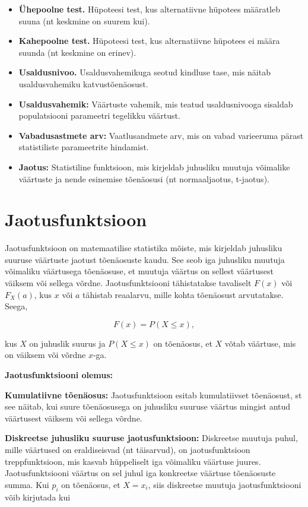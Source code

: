\documentclass[
]{book}
\providecommand{\tightlist}{%
  \setlength{\itemsep}{0pt}\setlength{\parskip}{0pt}}
\theoremstyle{definition}
\theoremstyle{definition}
\theoremstyle{definition}
\theoremstyle{definition}
\theoremstyle{remark}
\begin{document}
\begin{itemize}
\tightlist
\item
  \textbf{Ühepoolne test.} Hüpoteesi test, kus alternatiivne hüpotees määratleb suuna (nt keskmine on suurem kui).
\item
  \textbf{Kahepoolne test.} Hüpoteesi test, kus alternatiivne hüpotees ei määra suunda (nt keskmine on erinev).
\item
  \textbf{Usaldusnivoo.} Usaldusvahemikuga seotud kindluse tase, mis näitab usaldusvahemiku katvustõenäosust.
\item
  \textbf{Usaldusvahemik:} Väärtuste vahemik, mis teatud usaldusnivooga sisaldab populatsiooni parameetri tegelikku väärtust.
\item
  \textbf{Vabadusastmete arv:} Vaatlusandmete arv, mis on vabad varieeruma pärast statistiliste parameetrite hindamist.
\item
  \textbf{Jaotus:} Statistiline funktsioon, mis kirjeldab juhusliku muutuja võimalike väärtuste ja nende esinemise tõenäosusi (nt normaaljaotus, t-jaotus).
\end{itemize}

\section{Jaotusfunktsioon}\label{jaotusfunktsioon}

Jaotusfunktsioon on matemaatilise statistika mõiste, mis kirjeldab juhusliku suuruse väärtuste jaotust tõenäosuste kaudu. See seob iga juhusliku muutuja võimaliku väärtusega tõenäosuse, et muutuja väärtus on sellest väärtusest väiksem või sellega võrdne. Jaotusfunktsiooni tähistatakse tavaliselt \(F(x)\) või \(F_X(a)\), kus \(x\) või \(a\) tähistab reaalarvu, mille kohta tõenäosust arvutatakse. Seega,

\[F(x) = P(X \leq x),\]

kus \(X\) on juhuslik suurus ja \(P(X \leq x)\) on tõenäosus, et \(X\) võtab väärtuse, mis on väiksem või võrdne \(x\)-ga.

\textbf{Jaotusfunktsiooni olemus:}

\textbf{Kumulatiivne tõenäosus:} Jaotusfunktsioon esitab kumulatiivset tõenäosust, st see näitab, kui suure tõenäosusega on juhusliku suuruse väärtus mingist antud väärtusest väiksem või sellega võrdne.

\textbf{Diskreetse juhusliku suuruse jaotusfunktsioon:} Diskreetse muutuja puhul, mille väärtused on eraldiseisvad (nt täisarvud), on jaotusfunktsioon treppfunktsioon, mis kasvab hüppeliselt iga võimaliku väärtuse juures. Jaotusfunktsiooni väärtus on sel juhul iga konkreetse väärtuse tõenäosuste summa. Kui \(p_i\) on tõenäosus, et \(X = x_i\), siis diskreetse muutuja jaotusfunktsiooni võib kirjutada kui
\end{document}
